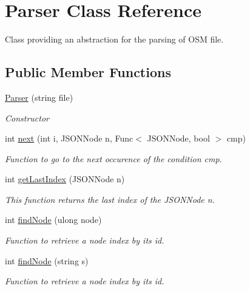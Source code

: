 \hypertarget{classParser}{}\section{Parser Class Reference}
\label{classParser}


Class providing an abstraction for the parsing of O\+SM file.  


\subsection*{Public Member Functions}
\begin{DoxyCompactItemize}
\item 
\hyperlink{classParser_afc8c6d06d662fe845cf2bc614107adba}{Parser} (string file)
\begin{DoxyCompactList}\small\item\em Constructor \end{DoxyCompactList}\item 
int \hyperlink{classParser_a01de6e0804b215480d23b0b6ba23105d}{next} (int i, J\+S\+O\+N\+Node n, Func$<$ J\+S\+O\+N\+Node, bool $>$ cmp)
\begin{DoxyCompactList}\small\item\em Function to go to the next occurence of the condition cmp. \end{DoxyCompactList}\item 
int \hyperlink{classParser_a7099a12c9a99780c36305dae1541c6bf}{get\+Last\+Index} (J\+S\+O\+N\+Node n)
\begin{DoxyCompactList}\small\item\em This function returns the last index of the J\+S\+O\+N\+Node \textquotesingle{}n\textquotesingle{}. \end{DoxyCompactList}\item 
int \hyperlink{classParser_a11cf257955d37fc10f3a003011e426b1}{find\+Node} (ulong node)
\begin{DoxyCompactList}\small\item\em Function to retrieve a node index by its id. \end{DoxyCompactList}\item 
int \hyperlink{classParser_a6c935988689e10f4d853a121f8325779}{find\+Node} (string s)
\begin{DoxyCompactList}\small\item\em Function to retrieve a node index by its id. \end{DoxyCompactList}\item 

\end{DoxyCompactItemize}
